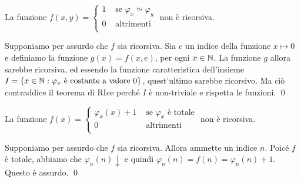 \documentclass[runningheads,a4paper]{llncs}
\begin{document}
\begin{exercise}
La funzione
$f(x,y) = 
\begin{cases}
1 & \text{ se $\varphi_x \simeq \varphi_y$} \\
0 & \text{ altrimenti } \\
\end{cases}
$
non \`{e} ricorsiva.
\end{exercise}

\begin{solution}
Supponiamo per assurdo che $f$ sia ricorsiva. Sia $e$ un indice della funzione $x \mapsto 0$ e definiamo la funzione
 $g(x) = f(x,e)$, per ogni $x \in \mathbb{N}$. La funzione $g$ allora sarebbe ricorsiva, ed essendo la funzione caratteristica
 dell'insieme $I=\{x \in\mathbb{N} : \varphi_x \text{ \`{e} costante a valore } 0\}$, quest'ultimo sarebbe ricorsivo.
 Ma ci\`{o} contraddice il teorema di RIce perch\'{e} $I$ \`{e} non-triviale e rispetta le funzioni.
\qed\end{solution}

\begin{exercise}
La funzione
$f(x) = 
\begin{cases}
\varphi_x(x) + 1 & \text{ se $\varphi_x$ \`{e} totale} \\
0 & \text{ altrimenti } \\
\end{cases}
$
non \`{e} ricorsiva.
\end{exercise}

\begin{solution}
Supponiamo per assurdo che $f$ sia ricorsiva. Allora ammette un indice $n$. Poic\'{e} $f$ \`{e} totale, abbiamo che $\varphi_n(n)\downarrow$
 e quindi $\varphi_n(n) = f(n) = \varphi_n(n) + 1$. Questo \`{e} assurdo.
\qed\end{solution}

%
\end{document}

